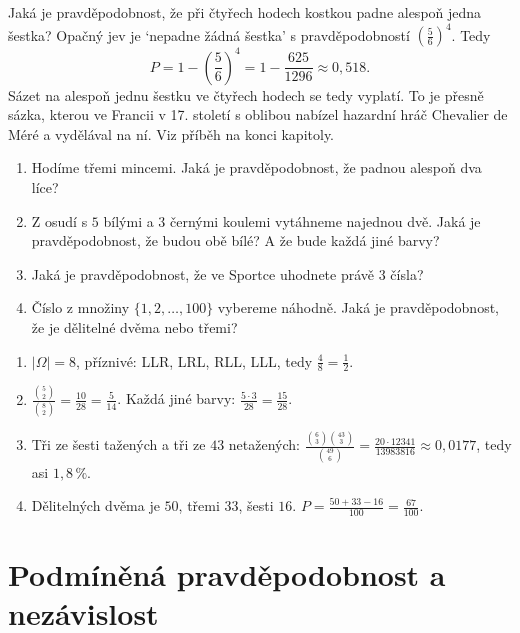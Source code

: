 \begin{example}
  Jaká je pravděpodobnost, že při čtyřech hodech kostkou padne alespoň jedna šestka? Opačný jev je `nepadne žádná šestka' s pravděpodobností ${\left(\frac{5}{6}\right)}^4$. Tedy
  \begin{equation*}
    P = 1 - {\left(\frac{5}{6}\right)}^4 = 1 - \frac{625}{1296}\approx 0{,}518.
  \end{equation*}
  Sázet na alespoň jednu šestku ve čtyřech hodech se tedy vyplatí. To je přesně sázka, kterou ve Francii v 17. století s oblibou nabízel hazardní hráč Chevalier de Méré a vydělával na ní. Viz příběh na konci kapitoly.
\end{example}

\begin{problem}
  \begin{enumerate}[label=(\alph*)]
    \item Hodíme třemi mincemi. Jaká je pravděpodobnost, že padnou alespoň dva líce?
    \item Z osudí s $5$ bílými a $3$ černými koulemi vytáhneme najednou dvě. Jaká je pravděpodobnost, že budou obě bílé? A že bude každá jiné barvy?
    \item Jaká je pravděpodobnost, že ve Sportce uhodnete právě $3$ čísla?
    \item Číslo z množiny $\{1, 2, \ldots, 100\}$ vybereme náhodně. Jaká je pravděpodobnost, že je dělitelné dvěma nebo třemi?
  \end{enumerate}
\end{problem}

\begin{solution}
  \begin{enumerate}[label=(\alph*)]
    \item $|\Omega| = 8$, příznivé: LLR, LRL, RLL, LLL, tedy $\frac{4}{8} = \frac{1}{2}$.
    \item $\frac{\binom{5}{2}}{\binom{8}{2}} = \frac{10}{28} = \frac{5}{14}$. Každá jiné barvy: $\frac{5\cdot 3}{28} = \frac{15}{28}$.
    \item Tři ze šesti tažených a tři ze $43$ netažených: $\frac{\binom{6}{3}\binom{43}{3}}{\binom{49}{6}} = \frac{20\cdot 12341}{13983816}\approx 0{,}0177$, tedy asi $1{,}8\,\%$.
    \item Dělitelných dvěma je $50$, třemi $33$, šesti $16$. $P = \frac{50 + 33 - 16}{100} = \frac{67}{100}$.
  \end{enumerate}
\end{solution}

\section{Podmíněná pravděpodobnost a nezávislost}\label{sec:podminena-pravdepodobnost}

